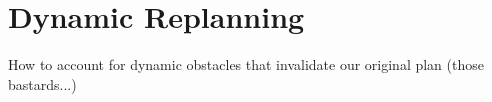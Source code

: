\section{Dynamic Replanning}

How to account for dynamic obstacles that invalidate our original plan (those bastards...)
